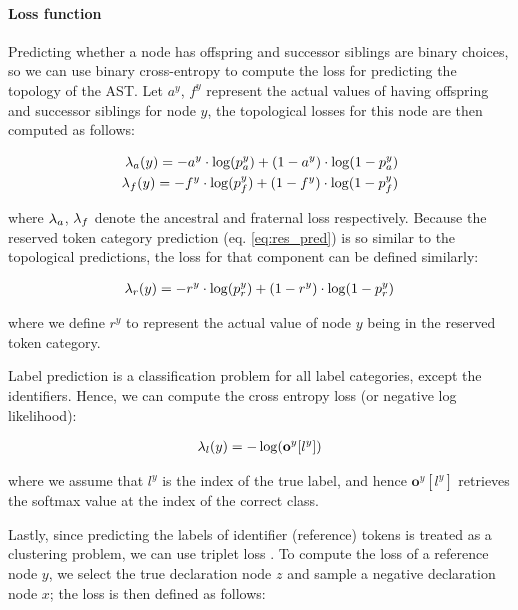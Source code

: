 \paragraph{Loss function}
Predicting whether a node has offspring and successor siblings are binary choices, so we can use binary cross-entropy to compute the loss for predicting the topology of the AST. 
Let $a^y$, $f^y$ represent the actual values of having offspring and successor siblings for node $y$, the topological losses for this node are then computed as follows:

\begin{align}
    \lambda_{a}(y) = - a^y \cdot \log(p^y_a) + (1 - a^y) \cdot \log(1 - p^y_a) \\
    \lambda_{f}(y) = - f^y \cdot \log(p^y_f) + (1 - f^y) \cdot \log(1 - p^y_f)
\end{align}

\noindent where $\lambda_{a}$, $\lambda_{f}$ denote the ancestral and fraternal loss respectively. Because the reserved token category prediction (eq. \ref{eq:res_pred}) is so similar to the topological predictions, the loss for that component can be defined similarly:

\begin{align}
    \lambda_{r}(y) = - r^y \cdot \log(p^y_r) + (1 - r^y) \cdot \log(1 - p^y_r)
\end{align}

\noindent where we define $r^y$ to represent the actual value of node $y$ being in the reserved token category. 



Label prediction is a classification problem for all label categories, except the identifiers.
Hence, we can compute the cross entropy loss (or negative log likelihood):

\begin{align}
    \lambda_{l}(y) = - \log(\mathbf{o}^y[l^y])
\end{align}

\noindent where we assume that $l^y$ is the index of the true label, and hence $\mathbf{o}^y[l^y]$ retrieves the softmax value at the index of the correct class. 

Lastly, since predicting the labels of identifier (reference) tokens is treated as a clustering problem, we can use triplet loss \cite{chechik2010large}. 
To compute the loss of a reference node $y$, we select the true declaration node $z$ and sample a negative declaration node $x$; the loss is then defined as follows:

